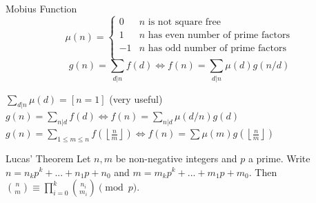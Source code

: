 \begin{misc}{Mobius Function}
	\[
		\mu(n) = \begin{cases} 0 & n \textrm{ is not square free}\\ 1 & n \textrm{ has even number of prime factors}\\ -1 & n \textrm{ has odd number of prime factors}\\\end{cases}
	\]
	\[ g(n) = \sum_{d|n} f(d) \Leftrightarrow f(n) = \sum_{d|n} \mu(d)g(n/d) \]

	$ \sum_{d | n} \mu(d) = [ n = 1] $ (very useful) \\
	$ g(n) = \sum_{n|d} f(d) \Leftrightarrow f(n) = \sum_{n|d} \mu(d/n)g(d)$ \\
	$ g(n) = \sum_{1 \leq m \leq n} f(\left\lfloor\frac{n}{m}\right \rfloor ) \Leftrightarrow f(n) = \sum \mu(m)g(\left\lfloor\frac{n}{m}\right\rfloor)$
\end{misc}

\begin{misc}{Lucas' Theorem}
	Let $n,m$ be non-negative integers and $p$ a prime. Write $n=n_kp^k+...+n_1p+n_0$ and $m=m_kp^k+...+m_1p+m_0$. Then $\binom{n}{m} \equiv \prod_{i=0}^k\binom{n_i}{m_i} \pmod{p}$.
\end{misc}
